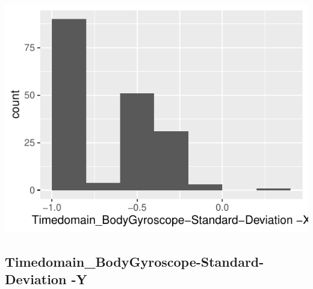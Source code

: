 \documentclass[
]{article}
\begin{document}
\begin{minipage}{0.25 \textwidth}

\includegraphics{codebook_tidydatasub_files/figure-latex/Var-24-Timedomain-BodyGyroscope-Standard-Deviation--X-1.pdf}

\end{minipage}

\noindent\makebox[\linewidth]{\rule{\textwidth}{0.4pt}}

\hypertarget{timedomain_bodygyroscope-standard-deviation--y}{%
\subsection{Timedomain\_BodyGyroscope-Standard-Deviation
-Y}\label{timedomain_bodygyroscope-standard-deviation--y}}
\end{document}
